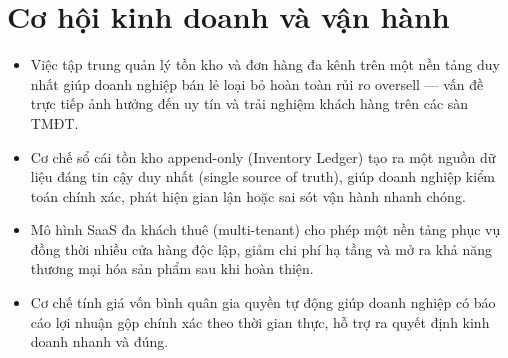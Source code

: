 \section{Cơ hội kinh doanh và vận hành}
\begin{itemize}
    \item Việc tập trung quản lý tồn kho và đơn hàng đa kênh trên một nền tảng duy nhất giúp doanh nghiệp bán lẻ loại bỏ hoàn toàn rủi ro oversell — vấn đề trực tiếp ảnh hưởng đến uy tín và trải nghiệm khách hàng trên các sàn TMĐT.
    \item Cơ chế sổ cái tồn kho append-only (Inventory Ledger) tạo ra một nguồn dữ liệu đáng tin cậy duy nhất (single source of truth), giúp doanh nghiệp kiểm toán chính xác, phát hiện gian lận hoặc sai sót vận hành nhanh chóng.
    \item Mô hình SaaS đa khách thuê (multi-tenant) cho phép một nền tảng phục vụ đồng thời nhiều cửa hàng độc lập, giảm chi phí hạ tầng và mở ra khả năng thương mại hóa sản phẩm sau khi hoàn thiện.
    \item Cơ chế tính giá vốn bình quân gia quyền tự động giúp doanh nghiệp có báo cáo lợi nhuận gộp chính xác theo thời gian thực, hỗ trợ ra quyết định kinh doanh nhanh và đúng.
\end{itemize}
